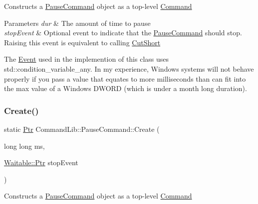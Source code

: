 Constructs a \mbox{\hyperlink{class_command_lib_1_1_pause_command}{Pause\+Command}} object as a top-\/level \mbox{\hyperlink{class_command_lib_1_1_command}{Command}}


\begin{DoxyParams}{Parameters}
{\em dur} & The amount of time to pause\\
\hline
{\em stop\+Event} & Optional event to indicate that the \mbox{\hyperlink{class_command_lib_1_1_pause_command}{Pause\+Command}} should stop. Raising this event is equivalent to calling \mbox{\hyperlink{class_command_lib_1_1_pause_command_a1a02c8ebd44bd32cdc72731d2a16d232}{Cut\+Short}} \\
\hline
\end{DoxyParams}


The \mbox{\hyperlink{class_command_lib_1_1_event}{Event}} used in the implemention of this class uses std\+::condition\+\_\+variable\+\_\+any. In my experience, Windows systems will not behave properly if you pass a value that equates to more milliseconds than can fit into the max value of a Windows D\+W\+O\+RD (which is under a month long duration). \mbox{\label{class_command_lib_1_1_pause_command_a76090daf88f99b4e36414a853f3eb447}} 
\subsubsection{\texorpdfstring{Create()}{Create()}\hspace{0.1cm}{\footnotesize\ttfamily [4/4]}}
{\footnotesize\ttfamily static \mbox{\hyperlink{class_command_lib_1_1_command_a3b3e4f00144373299df5c6bb1acc319d}{Ptr}} Command\+Lib\+::\+Pause\+Command\+::\+Create (\begin{DoxyParamCaption}\item[{long long}]{ms,  }\item[{\mbox{\hyperlink{class_command_lib_1_1_waitable_ac74b6b91e48220146eada76a31cf2d9b}{Waitable\+::\+Ptr}}}]{stop\+Event }\end{DoxyParamCaption})\hspace{0.3cm}{\ttfamily [static]}}



Constructs a \mbox{\hyperlink{class_command_lib_1_1_pause_command}{Pause\+Command}} object as a top-\/level \mbox{\hyperlink{class_command_lib_1_1_command}{Command}}


